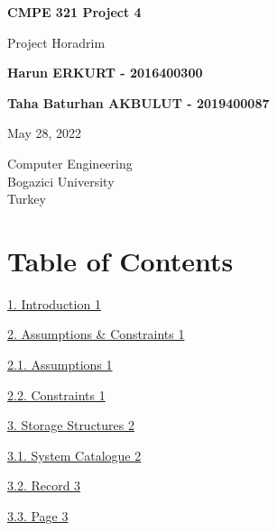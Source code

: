 \documentclass[
]{article}
\author{}
\date{}
\begin{document}
\begin{titlepage}
   \begin{center}
       \vspace*{1cm}

       \textbf{CMPE 321 Project 4}

       \vspace{0.5cm}
        Project Horadrim
            
       \vspace{1.5cm}

       \textbf{Harun ERKURT - 2016400300}
       
       \vspace{.5cm}
       
       \textbf{Taha Baturhan AKBULUT - 2019400087}

       \vfill
            
       May 28, 2022\\
            
       \vspace{0.8cm}
     
            
       Computer Engineering\\
       Bogazici University\\
       Turkey\\
            
   \end{center}
\end{titlepage}


\textbf{\hfill\break
}

\hypertarget{table-of-contents}{%
\section{Table of Contents}\label{table-of-contents}}

\protect\hyperlink{introduction}{1. Introduction 1}

\protect\hyperlink{assumptions-constraints}{2. Assumptions \&
Constraints 1}

\protect\hyperlink{assumptions}{2.1. Assumptions 1}

\protect\hyperlink{constraints}{2.2. Constraints 1}

\protect\hyperlink{storage-structures}{3. Storage Structures 2}

\protect\hyperlink{system-catalogue}{3.1. System Catalogue 2}

\protect\hyperlink{record}{3.2. Record 3}

\protect\hyperlink{page}{3.3. Page 3}
\end{document}
